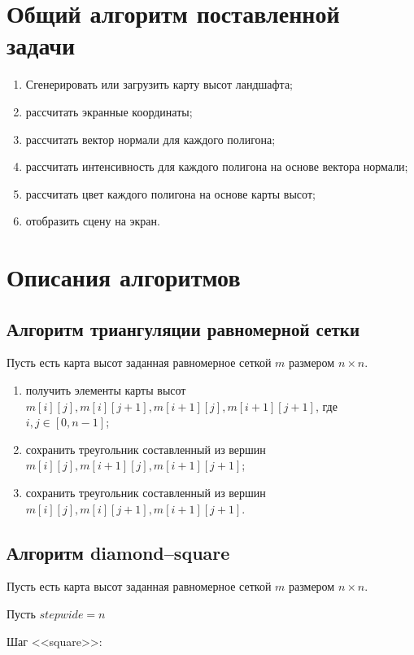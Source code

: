 \section{Общий алгоритм поставленной задачи}

\begin{enumerate}
	\item Сгенерировать или загрузить карту высот ландшафта;
	\item рассчитать экранные координаты;
	\item рассчитать вектор нормали для каждого полигона;
	\item рассчитать интенсивность для каждого полигона на основе вектора нормали;
	\item рассчитать цвет каждого полигона на основе карты высот;
	\item отобразить сцену на экран.
\end{enumerate}

\section{Описания алгоритмов}

\subsection{Алгоритм триангуляции равномерной сетки}

Пусть есть карта высот заданная равномерное сеткой $m$ размером $n \times n$.

\begin{enumerate}
	\item получить элементы карты высот $m[i][j], m[i][j + 1], m[i + 1][j], m[i + 1][j + 1]$, где $i, j \in [0, n - 1]$;
	\item сохранить треугольник составленный из вершин $m[i][j], m[i + 1][j], m[i + 1][j + 1]$;
	\item сохранить треугольник составленный из вершин $m[i][j], m[i][j + 1], m[i + 1][j + 1]$.
\end{enumerate}

\subsection{Алгоритм diamond--square}

Пусть есть карта высот заданная равномерное сеткой $m$ размером $n \times n$.

Пусть $step wide = n$

Шаг <<square>>:

